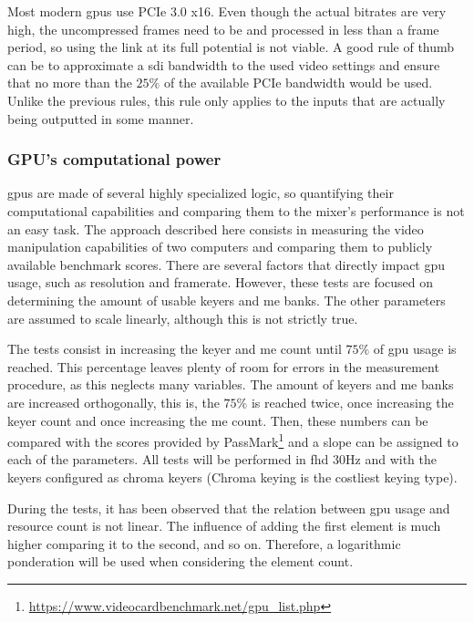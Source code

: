 \documentclass[../main.tex]{subfiles}
\begin{document}
Most modern \glspl{gpu} use PCIe 3.0 x16. Even though the actual bitrates are very high, the uncompressed frames need to be and processed in less than a frame period, so using the link at its full potential is not viable. A good rule of thumb can be to approximate a \gls{sdi} bandwidth to the used video settings and ensure that no more than the $25\%$ of the available PCIe bandwidth would be used. Unlike the previous rules, this rule only applies to the inputs that are actually being outputted in some manner.\newline



\subsubsection{GPU's computational power}
\Glspl{gpu} are made of several highly specialized logic, so quantifying their computational capabilities and comparing them to the mixer's performance is not an easy task. The approach described here consists in measuring the video manipulation capabilities of two computers and comparing them to publicly available benchmark scores. There are several factors that directly impact \gls{gpu} usage, such as resolution and framerate. However, these tests are focused on determining the amount of usable keyers and \gls{me} banks. The other parameters are assumed to scale linearly, although this is not strictly true.\newline

The tests consist in increasing the keyer and \gls{me} count until $75\%$ of \gls{gpu} usage is reached. This percentage leaves plenty of room for errors in the measurement procedure, as this neglects many variables. The amount of keyers and \gls{me} banks are increased orthogonally, this is, the $75\%$ is reached twice, once increasing the keyer count and once increasing the \gls{me} count. Then, these numbers can be compared with the scores provided by PassMark\footnote{\url{https://www.videocardbenchmark.net/gpu_list.php}} and a slope can be assigned to each of the parameters. All tests will be performed in \gls{fhd} $30\si{\hertz}$ and with the keyers configured as chroma keyers (Chroma keying is the costliest keying type).\newline

During the tests, it has been observed that the relation between \gls{gpu} usage and resource count is not linear. The influence of adding the first element is much higher comparing it to the second, and so on. Therefore, a logarithmic ponderation will be used when considering the element count.\newline
\end{document}
